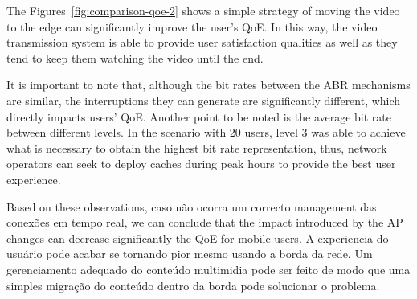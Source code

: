 
The Figures~\ref{fig:comparison-qoe-2} shows a simple strategy of moving the video to the edge can significantly improve the user's QoE. In this way, the video transmission system is able to provide user satisfaction qualities as well as they tend to keep them watching the video until the end. 

It is important to note that, although the bit rates between the ABR mechanisms are similar, the interruptions they can generate are significantly different, which directly impacts users' QoE. Another point to be noted is the average bit rate between different levels. In the scenario with 20 users, level 3 was able to achieve what is necessary to obtain the highest bit rate representation, thus, network operators can seek to deploy caches during peak hours to provide the best user experience.

Based on these observations, caso não ocorra um correcto management das conexões em tempo real,  we can conclude that the impact introduced by the AP changes can decrease significantly the QoE for mobile users. A experiencia do usuário pode acabar se tornando pior mesmo usando a borda da rede. Um gerenciamento adequado do conteúdo multimidia pode ser feito de modo que uma simples migração do conteúdo dentro da borda pode solucionar o problema.















































